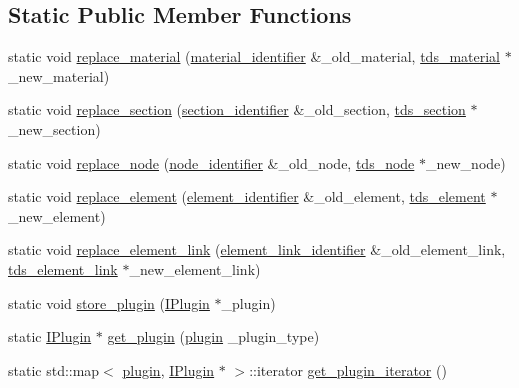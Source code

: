 \subsection*{Static Public Member Functions}
\begin{DoxyCompactItemize}
\item 
static void \hyperlink{classIPlugin_a71df92f53107b9bcd192b5350015564a}{replace\+\_\+material} (\hyperlink{structmaterial__identifier}{material\+\_\+identifier} \&\+\_\+old\+\_\+material, \hyperlink{classtds__material}{tds\+\_\+material} $\ast$\+\_\+new\+\_\+material)
\item 
static void \hyperlink{classIPlugin_a556bd8c06154fd0c8d242716800a1cbd}{replace\+\_\+section} (\hyperlink{structsection__identifier}{section\+\_\+identifier} \&\+\_\+old\+\_\+section, \hyperlink{classtds__section}{tds\+\_\+section} $\ast$\+\_\+new\+\_\+section)
\item 
static void \hyperlink{classIPlugin_af24478525e3d6e2ae4f1ea4c0a45447f}{replace\+\_\+node} (\hyperlink{structnode__identifier}{node\+\_\+identifier} \&\+\_\+old\+\_\+node, \hyperlink{classtds__node}{tds\+\_\+node} $\ast$\+\_\+new\+\_\+node)
\item 
static void \hyperlink{classIPlugin_a2d54b9b3448793b0727fadbc88c4a638}{replace\+\_\+element} (\hyperlink{structelement__identifier}{element\+\_\+identifier} \&\+\_\+old\+\_\+element, \hyperlink{classtds__element}{tds\+\_\+element} $\ast$\+\_\+new\+\_\+element)
\item 
static void \hyperlink{classIPlugin_a69d193a4010c669c8fcab69e65aa71cc}{replace\+\_\+element\+\_\+link} (\hyperlink{structelement__link__identifier}{element\+\_\+link\+\_\+identifier} \&\+\_\+old\+\_\+element\+\_\+link, \hyperlink{classtds__element__link}{tds\+\_\+element\+\_\+link} $\ast$\+\_\+new\+\_\+element\+\_\+link)
\item 
static void \hyperlink{classIPlugin_a580c91846f40f7a7f0c8d6819af66c42}{store\+\_\+plugin} (\hyperlink{classIPlugin}{I\+Plugin} $\ast$\+\_\+plugin)
\item 
static \hyperlink{classIPlugin}{I\+Plugin} $\ast$ \hyperlink{classIPlugin_a556f56970ad0bfcaf7f9fa58332a471c}{get\+\_\+plugin} (\hyperlink{plugins_8hh_af34747f68f9b0963dea6e8f3c659659c}{plugin} \+\_\+plugin\+\_\+type)
\item 
static std\+::map$<$ \hyperlink{plugins_8hh_af34747f68f9b0963dea6e8f3c659659c}{plugin}, \hyperlink{classIPlugin}{I\+Plugin} $\ast$ $>$\+::iterator \hyperlink{classIPlugin_a1d69f3981baaa8a18abd6ba5f417f6d2}{get\+\_\+plugin\+\_\+iterator} ()

\end{DoxyCompactItemize}

